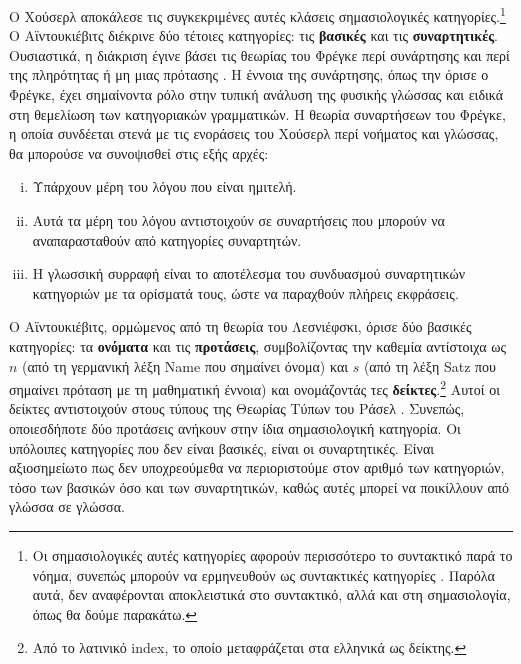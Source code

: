 \documentclass [a4paper,11pt] {book}
\theoremstyle{definition}
\theoremstyle{definition}
\begin{document}
Ο Χούσερλ αποκάλεσε τις συγκεκριμένες αυτές κλάσεις σημασιολογικές κατηγορίες.\footnote{Οι σημασιολογικές αυτές κατηγορίες αφορούν περισσότερο το συντακτικό παρά το νόημα, συνεπώς μπορούν να ερμηνευθούν ως συντακτικές κατηγορίες \citep{Schmicking2009}. Παρόλα αυτά, δεν αναφέρονται αποκλειστικά στο συντακτικό, αλλά και στη σημασιολογία, όπως θα δούμε παρακάτω.} Ο Αϊντουκιέβιτς διέκρινε δύο τέτοιες κατηγορίες: τις \textbf{βασικές} και τις \textbf{συναρτητικές}. Ουσιαστικά, η διάκριση έγινε βάσει τις θεωρίας του Φρέγκε περί συνάρτησης και περί της πληρότητας ή μη μιας πρότασης \citep{Frege1891-FREFUB}. Η έννοια της συνάρτησης, όπως την όρισε ο Φρέγκε, έχει σημαίνοντα ρόλο στην τυπική ανάλυση της φυσικής γλώσσας και ειδικά στη θεμελίωση των κατηγοριακών γραμματικών. Η θεωρία συναρτήσεων του Φρέγκε, η οποία συνδέεται στενά με τις ενοράσεις του Χούσερλ περί νοήματος και γλώσσας, θα μπορούσε να συνοψισθεί στις εξής αρχές:
\begin{enumerate}[(i)]
\label{FregeTheory}
\item Υπάρχουν μέρη του λόγου που είναι ημιτελή.
\item Αυτά τα μέρη του λόγου αντιστοιχούν σε συναρτήσεις που μπορούν να αναπαρασταθούν από κατηγορίες συναρτητών.
\item Η γλωσσική συρραφή είναι το αποτέλεσμα του συνδυασμού συναρτητικών κατηγοριών με τα ορίσματά τους, ώστε να παραχθούν πλήρεις εκφράσεις.
\end{enumerate}
Ο Αϊντουκιέβιτς, ορμώμενος από τη θεωρία του Λεσνιέφσκι, όρισε δύο βασικές κατηγορίες: τα \textbf{ονόματα} και τις \textbf{προτάσεις}, συμβολίζοντας την καθεμία αντίστοιχα ως $n$ (από τη γερμανική λέξη Name που σημαίνει όνομα) και $s$ (από τη λέξη Satz που σημαίνει πρόταση με τη μαθηματική έννοια) και ονομάζοντάς τες \textbf{δείκτες}.\footnote{Από το λατινικό index, το οποίο μεταφράζεται στα ελληνικά ως δείκτης.}
Αυτοί οι δείκτες αντιστοιχούν στους τύπους της Θεωρίας Τύπων του Ράσελ \citep{citeulike:266343}. Συνεπώς, οποιεσδήποτε δύο προτάσεις ανήκουν στην ίδια σημασιολογική κατηγορία. Οι υπόλοιπες κατηγορίες που δεν είναι βασικές, είναι οι συναρτητικές. Είναι αξιοσημείωτο πως δεν υποχρεούμεθα να περιοριστούμε στον αριθμό των κατηγοριών, τόσο των βασικών όσο και των συναρτητικών, καθώς αυτές μπορεί να ποικίλλουν από γλώσσα σε γλώσσα.
\end{document}
